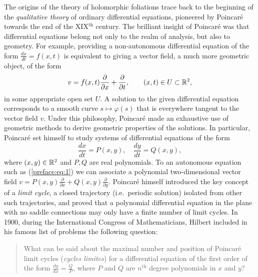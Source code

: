 \documentclass[phd,tocprelim]{cornell}
\begin{document}
The origins of the theory of holomorphic foliations trace back to the beginning of the \textit{qualitative theory} of ordinary differential equations, pioneered by Poincar\'{e} towards the end of the XIX$^{\text{th}}$ century. 
%
%
The brilliant insight of Poincar\'{e} was that differential equations belong not only to the realm of analysis, but also to geometry. For example, providing a non-autonomous differential equation of the form $\displaystyle\frac{dx}{dt}=f(x,t)$ is equivalent to giving a vector field, a much more geometric object, of the form
 \[ v = f(x,t)\frac{\partial}{\partial x} + \frac{\partial}{\partial t}, \qquad (x,t)\in U\subset\mathbb{R}^2, \]
in some appropriate open set $U$. A solution to the given differential equation corresponds to a smooth curve $s\mapsto\varphi(s)$ that is everywhere tangent to the vector field $v$. Under this philosophy, Poincar\'{e} made an exhaustive use of geometric methods to derive geometric properties of the solutions. In particular, Poincar\'{e} set himself to study systems of differential equations of the form 
\begin{equation}\label{preface:eq:1}
 \frac{dx}{dt}=P(x,y), \quad \frac{dy}{dt}=Q(x,y),
\end{equation}
where $(x,y)\in\mathbb{R}^2$ and $P,Q$ are real polynomials. To an autonomous equation such as (\ref{preface:eq:1}) we can associate a polynomial two-dimensional vector field $\displaystyle v=P(x,y)\frac{\partial}{\partial x} + Q(x,y)\frac{\partial}{\partial y}$. Poincar\'{e} himself introduced the key concept of a \textit{limit cycle}, a closed trajectory (i.e.~periodic solution) isolated from other such trajectories, and proved that a polynomial differential equation in the plane with no saddle connections may only have a finite number of limit cycles. 
%
%
In 1900, during the International Congress of Mathematicians, Hilbert included in his famous list of problems the following question:

\bigskip
\begin{quote}
\singlespacing
 What can be said about the maximal number and position of Poincar\'{e} limit cycles (\textit{cycles limites}) for a differential equation of the first order of the form $\frac{dy}{dx}=\frac{Q}{P}$, where $P$ and $Q$ are $n^{\text{th}}$ degree polynomials in $x$ and $y$?
\end{quote}
\end{document}

